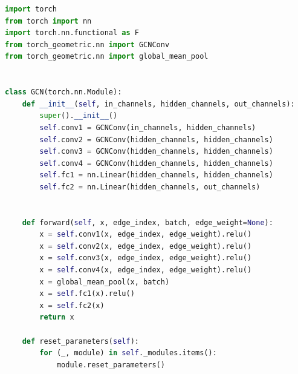 \documentclass{article}
\begin{document}
\begin{lstlisting}[language=Python]
import torch
from torch import nn
import torch.nn.functional as F
from torch_geometric.nn import GCNConv
from torch_geometric.nn import global_mean_pool


class GCN(torch.nn.Module):
    def __init__(self, in_channels, hidden_channels, out_channels):
        super().__init__()
        self.conv1 = GCNConv(in_channels, hidden_channels)
        self.conv2 = GCNConv(hidden_channels, hidden_channels)
        self.conv3 = GCNConv(hidden_channels, hidden_channels)
        self.conv4 = GCNConv(hidden_channels, hidden_channels)
        self.fc1 = nn.Linear(hidden_channels, hidden_channels)
        self.fc2 = nn.Linear(hidden_channels, out_channels)


    def forward(self, x, edge_index, batch, edge_weight=None):
        x = self.conv1(x, edge_index, edge_weight).relu()
        x = self.conv2(x, edge_index, edge_weight).relu()
        x = self.conv3(x, edge_index, edge_weight).relu()
        x = self.conv4(x, edge_index, edge_weight).relu()
        x = global_mean_pool(x, batch)
        x = self.fc1(x).relu()
        x = self.fc2(x)
        return x
    
    def reset_parameters(self):
        for (_, module) in self._modules.items():
            module.reset_parameters()

\end{lstlisting}
\end{document}
